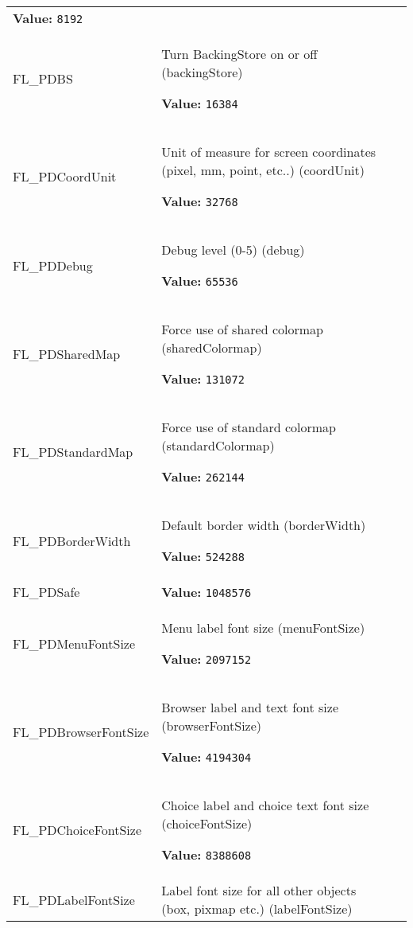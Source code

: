 \begin{longtable}{|p{\varnamewidth}|p{\vardescrwidth}|l}
\textbf{Value:} 
{\tt 8192}&\\
\cline{1-2}
\raggedright F\-L\-\_\-P\-D\-B\-S\- & \raggedright Turn BackingStore on or off (backingStore)

\textbf{Value:} 
{\tt 16384}&\\
\cline{1-2}
\raggedright F\-L\-\_\-P\-D\-C\-o\-o\-r\-d\-U\-n\-i\-t\- & \raggedright Unit of measure for screen coordinates (pixel, mm, point, etc..)
(coordUnit)

\textbf{Value:} 
{\tt 32768}&\\
\cline{1-2}
\raggedright F\-L\-\_\-P\-D\-D\-e\-b\-u\-g\- & \raggedright Debug level (0-5) (debug)

\textbf{Value:} 
{\tt 65536}&\\
\cline{1-2}
\raggedright F\-L\-\_\-P\-D\-S\-h\-a\-r\-e\-d\-M\-a\-p\- & \raggedright Force use of shared colormap (sharedColormap)

\textbf{Value:} 
{\tt 131072}&\\
\cline{1-2}
\raggedright F\-L\-\_\-P\-D\-S\-t\-a\-n\-d\-a\-r\-d\-M\-a\-p\- & \raggedright Force use of standard colormap (standardColormap)

\textbf{Value:} 
{\tt 262144}&\\
\cline{1-2}
\raggedright F\-L\-\_\-P\-D\-B\-o\-r\-d\-e\-r\-W\-i\-d\-t\-h\- & \raggedright Default border width (borderWidth)

\textbf{Value:} 
{\tt 524288}&\\
\cline{1-2}
\raggedright F\-L\-\_\-P\-D\-S\-a\-f\-e\- & \raggedright \textbf{Value:} 
{\tt 1048576}&\\
\cline{1-2}
\raggedright F\-L\-\_\-P\-D\-M\-e\-n\-u\-F\-o\-n\-t\-S\-i\-z\-e\- & \raggedright Menu label font size (menuFontSize)

\textbf{Value:} 
{\tt 2097152}&\\
\cline{1-2}
\raggedright F\-L\-\_\-P\-D\-B\-r\-o\-w\-s\-e\-r\-F\-o\-n\-t\-S\-i\-z\-e\- & \raggedright Browser label and text font size (browserFontSize)

\textbf{Value:} 
{\tt 4194304}&\\
\cline{1-2}
\raggedright F\-L\-\_\-P\-D\-C\-h\-o\-i\-c\-e\-F\-o\-n\-t\-S\-i\-z\-e\- & \raggedright Choice label and choice text font size (choiceFontSize)

\textbf{Value:} 
{\tt 8388608}&\\
\cline{1-2}
\raggedright F\-L\-\_\-P\-D\-L\-a\-b\-e\-l\-F\-o\-n\-t\-S\-i\-z\-e\- & \raggedright Label font size for all other objects (box, pixmap etc.) (labelFontSize)


\end{longtable}
